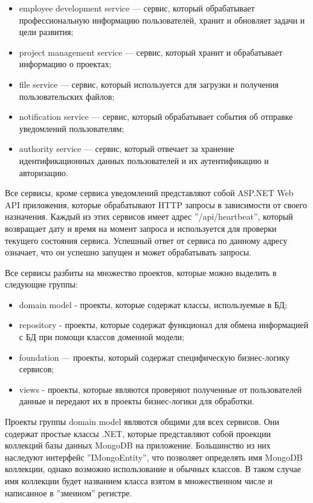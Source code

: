 \begin{itemize}
    \item employee development service — сервис, который обрабатывает профессиональную информацию пользователей, хранит и обновляет задачи и цели развития;
    \item project management service — сервис, который хранит и обрабатывает информацию о проектах;
    \item file service — сервис, который используется для загрузки и получения пользовательских файлов;
    \item notification service — сервис, который обрабатывает события об отправке уведомлений пользователям;
    \item authority service — сервис, который отвечает за хранение идентификационных данных пользователей и их аутентификацию и авторизацию.
\end{itemize}

Все сервисы, кроме сервиса уведомлений представляют собой ASP.NET Web API приложения, которые обрабатывают HTTP запросы в зависимости от своего назначения. Каждый из этих сервисов имеет адрес ''/api/heartbeat'', который возвращает дату и время на момент запроса и используется для проверки текущего состояния сервиса. Успешный ответ от сервиса по данному адресу означает, что он успешно запущен и может обрабатывать запросы.

Все сервисы разбиты на множество проектов, которые можно выделить в следующие группы:

\begin{itemize}
    \item domain model - проекты, которые содержат классы, используемые в БД;
    \item repository - проекты, которые содержат функционал для обмена информацией с БД при помощи классов доменной модели;
    \item foundation — проекты, который содержат специфическую бизнес-логику сервисов;
    \item views - проекты, которые являются проверяют полученные от пользователей данные и передают их в проекты бизнес-логики для обработки.
\end{itemize}

Проекты группы domain model являются общими для всех сервисов. Они содержат простые классы .NET, которые представляют собой проекции коллекций базы данных MongoDB на приложение. Большинство из них наследуют интерфейс ''IMongoEntity'', что позволяет определять имя MongoDB коллекции, однако возможно использование и обычных классов. В таком случае имя коллекции будет названием класса взятом в множественном числе и написанное в ''змеином'' регистре.

